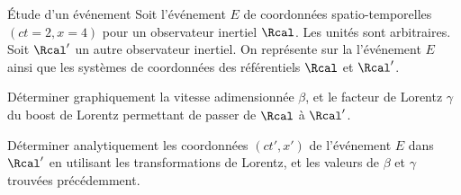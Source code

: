 \begin{exo}[PC][1][colle]{Étude d'un événement}
  Soit l'événement $E$ de coordonnées spatio-temporelles $(ct=2,x=4)$ pour un observateur inertiel $\Rcal$. Les unités sont arbitraires. Soit $\Rcal'$ un autre observateur inertiel. On représente sur la  l'événement $E$ ainsi que les systèmes de coordonnées des référentiels $\Rcal$ et $\Rcal'$.
  \begin{quest}
    \item  Déterminer graphiquement la vitesse adimensionnée $\beta$, et le facteur de Lorentz $\gamma$ du boost de Lorentz permettant de passer de $\Rcal$ à $\Rcal'$.
     \item Déterminer analytiquement les coordonnées $(ct',x')$ de l'événement $E$ dans  $\Rcal'$ en utilisant les transformations de Lorentz, et les valeurs de $\beta$ et $\gamma$ trouvées précédemment.



\end{quest}
\end{exo}
